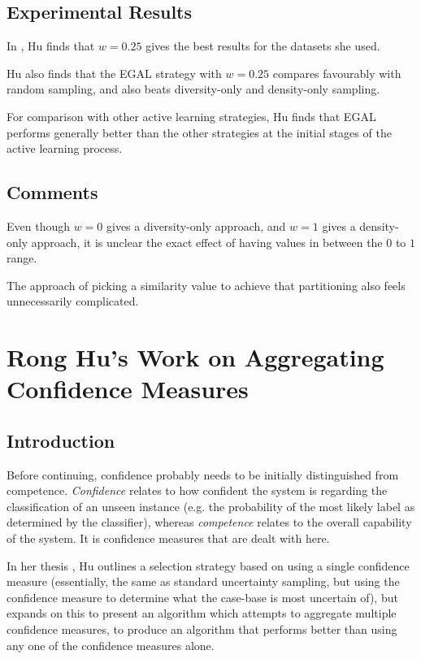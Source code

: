 \documentclass[a4paper,11pt]{report}
\begin{document}
\subsection{Experimental Results}
In \citet{Hu2011}, Hu finds that $w=0.25$ gives the best results for the datasets she used. 

Hu also finds that the EGAL strategy with $w=0.25$ compares favourably with random sampling, and also beats diversity-only and density-only sampling.

For comparison with other active learning strategies, Hu finds that EGAL performs generally better than the other strategies at the initial stages of the active learning process.

\subsection{Comments}
Even though $w=0$ gives a diversity-only approach, and $w=1$ gives a density-only approach, it is unclear the exact effect of having values in between the $0$ to $1$ range.

The approach of picking a similarity value to achieve that partitioning also feels unnecessarily complicated.

\section{Rong Hu's Work on Aggregating Confidence Measures}
\subsection{Introduction}
Before continuing, confidence probably needs to be initially distinguished from competence. \emph{Confidence} relates to how confident the system is regarding the classification of an unseen instance (e.g. the probability of the most likely label as determined by the classifier), whereas \emph{competence} relates to the overall capability of the system. It is confidence measures that are dealt with here.

In her thesis \citep{Hu2011}, Hu outlines a selection strategy based on using a single confidence measure (essentially, the same as standard uncertainty sampling, but using the confidence measure to determine what the case-base is most uncertain of), but expands on this to present an algorithm which attempts to aggregate multiple confidence measures, to produce an algorithm that performs better than using any one of the confidence measures alone.
\end{document}
